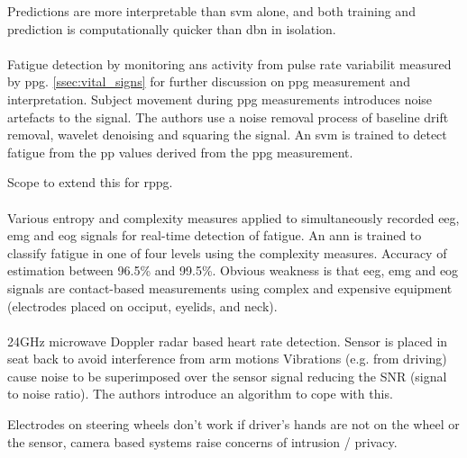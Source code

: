 \documentclass[11pt, parskip=half*,twoside=false]{scrbook}
\begin{document}
Predictions are more interpretable than \gls{svm} alone, and both training and prediction is computationally quicker than \gls{dbn} in isolation. 
 
\paragraph{\citet{kurianDrowsinessDetectionUsing2014a}} Fatigue detection by monitoring \gls{ans} activity from pulse rate variabilit measured by \gls{ppg}.  \cref{ssec:vital_signs} for further discussion on \gls{ppg} measurement and interpretation. Subject movement during \gls{ppg} measurements introduces noise artefacts to the signal. The authors use a noise removal process of baseline drift removal, wavelet denoising and squaring the signal. An \gls{svm} is trained to detect fatigue from the \gls{pp} values derived from the \gls{ppg} measurement. 

Scope to extend this for \gls{rppg}. 

\paragraph{\citet{zhangAutomatedDetectionDriver2014}} Various entropy and complexity measures applied to simultaneously recorded \gls{eeg}, \gls{emg} and \gls{eog} signals for real-time detection of fatigue. An \gls{ann} is trained to classify fatigue in one of four levels using the complexity measures. Accuracy of estimation between 96.5\% and 99.5\%. Obvious weakness is that \gls{eeg}, \gls{emg} and \gls{eog} signals are contact-based measurements using complex and expensive equipment (electrodes placed on occiput, eyelids, and neck). 

\paragraph{\citet{tsuchiyaHeartbeatDetectionTechnology2020}} 24GHz microwave Doppler radar based heart rate detection. Sensor is placed in seat back to avoid interference from arm motions  Vibrations (e.g. from driving) cause noise to be superimposed over the sensor signal reducing the SNR (signal to noise ratio). The authors introduce an algorithm to cope with this. 

Electrodes on steering wheels don't work if driver's hands are not on the wheel or the sensor, camera based systems raise concerns of intrusion / privacy. 
\end{document}
